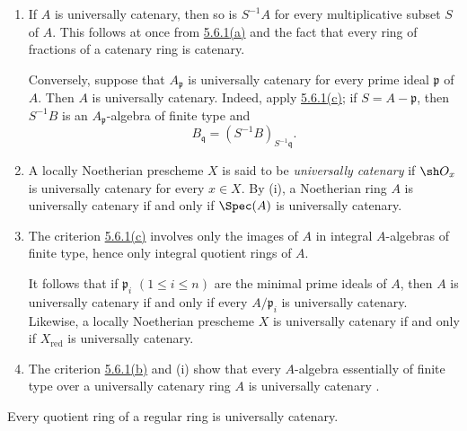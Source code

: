 \begin{remarks}[5.6.3]
\label{IV.5.6.3}
\begin{enumerate}[{\rm(i)}]
\item
{}
\label{IV.5.6.3.i}
If $A$ is universally catenary, then so is $S^{-1}A$ for every
multiplicative subset $S$ of $A$.  This follows at once from
{\hyperlink{ega4.c04.sec.5-6-1-a}{5.6.1\textup{(a)}}} and the fact that every ring
of fractions of a
catenary ring is catenary.

Conversely, suppose that $A_{\mathfrak p}$ is universally catenary
for every prime ideal $\mathfrak p$ of $A$.  Then $A$ is universally
catenary.  Indeed, apply
{\hyperlink{ega4.c04.sec.5-6-1-c}{5.6.1\textup{(c)}}}; if
$S=A-\mathfrak p$, then $S^{-1}B$ is an
$A_{\mathfrak p}$-algebra of finite type and
\[
B_{\mathfrak q}=(S^{-1}B)_{S^{-1}\mathfrak q}.
\]

\item
{}
\label{IV.5.6.3.ii}
A locally Noetherian prescheme $X$ is said to be
\emph{universally catenary} if $\sh O_x$ is universally catenary for
every $x\in X$.  By (i), a Noetherian ring $A$ is universally
catenary if and only if $\Spec(A)$ is universally catenary.

\item
{}
\label{IV.5.6.3.iii}
The criterion {\hyperlink{ega4.c04.sec.5-6-1-c}{5.6.1\textup{(c)}}} involves only
the images of $A$ in
integral $A$-algebras of finite type, hence only integral quotient
rings of $A$.


It follows that if
$\mathfrak p_i$ $(1\leq i\leq n)$ are the minimal prime ideals of
$A$, then $A$ is universally catenary if and only if every
$A/\mathfrak p_i$ is universally catenary.  Likewise, a locally
Noetherian prescheme $X$ is universally catenary if and only if
$X_{\mathrm{red}}$ is universally catenary.

\item
{}
\label{IV.5.6.3.iv}
The criterion {\hyperlink{ega4.c04.sec.5-6-1-b}{5.6.1\textup{(b)}}} and (i) show
that every $A$-algebra
essentially of finite type over a universally catenary ring $A$ is
universally catenary .
\end{enumerate}
\end{remarks}

\begin{proposition}[5.6.4]
\label{IV.5.6.4}
Every quotient ring of a regular ring is universally catenary.
\end{proposition}

